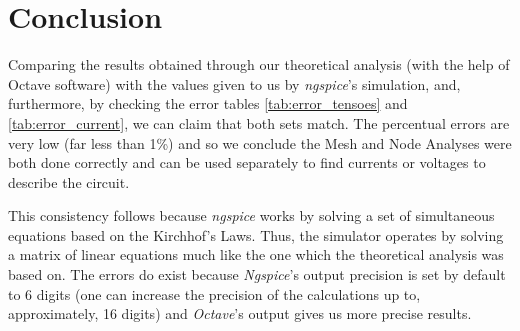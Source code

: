 \section{Conclusion}
\label{sec:conclusion}

Comparing the results obtained through our theoretical analysis (with the help of Octave
software) with the values given to us by \emph{ngspice}'s simulation, and, furthermore, by checking the
error tables \ref{tab:error_tensoes} and \ref{tab:error_current}, we can claim that both sets match. The percentual
errors are very low (far less than 1\%) and so we conclude the Mesh and Node Analyses were both done
correctly and can be used separately to find currents or voltages to describe the circuit.

\par

This consistency follows because \emph{ngspice} works by solving a set of simultaneous equations
based on the Kirchhof's Laws. Thus, the simulator operates by solving a matrix of linear equations much
like the one which the theoretical analysis was based on. The errors do exist because \emph{Ngspice}'s output
precision is set by default to 6 digits (one can increase the precision of the calculations up to, approximately,
16 digits) and \emph{Octave}'s output gives us more precise results.
